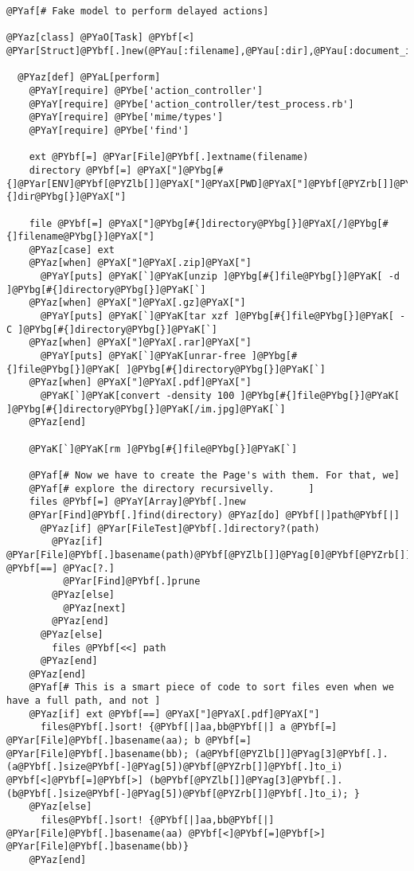 \begin{Verbatim}[commandchars=@\[\]]
@PYaf[# Fake model to perform delayed actions]

@PYaz[class] @PYaO[Task] @PYbf[<] @PYar[Struct]@PYbf[.]new(@PYau[:filename],@PYau[:dir],@PYau[:document_id])
  
  @PYaz[def] @PYaL[perform]
    @PYaY[require] @PYbe['action_controller']
    @PYaY[require] @PYbe['action_controller/test_process.rb']
    @PYaY[require] @PYbe['mime/types']
    @PYaY[require] @PYbe['find']
    
    ext @PYbf[=] @PYar[File]@PYbf[.]extname(filename)
    directory @PYbf[=] @PYaX["]@PYbg[#{]@PYar[ENV]@PYbf[@PYZlb[]]@PYaX["]@PYaX[PWD]@PYaX["]@PYbf[@PYZrb[]]@PYbg[}]@PYaX[/]@PYbg[#{]dir@PYbg[}]@PYaX["]

    file @PYbf[=] @PYaX["]@PYbg[#{]directory@PYbg[}]@PYaX[/]@PYbg[#{]filename@PYbg[}]@PYaX["]
    @PYaz[case] ext
    @PYaz[when] @PYaX["]@PYaX[.zip]@PYaX["]
      @PYaY[puts] @PYaK[`]@PYaK[unzip ]@PYbg[#{]file@PYbg[}]@PYaK[ -d ]@PYbg[#{]directory@PYbg[}]@PYaK[`]
    @PYaz[when] @PYaX["]@PYaX[.gz]@PYaX["]
      @PYaY[puts] @PYaK[`]@PYaK[tar xzf ]@PYbg[#{]file@PYbg[}]@PYaK[ -C ]@PYbg[#{]directory@PYbg[}]@PYaK[`]
    @PYaz[when] @PYaX["]@PYaX[.rar]@PYaX["]
      @PYaY[puts] @PYaK[`]@PYaK[unrar-free ]@PYbg[#{]file@PYbg[}]@PYaK[ ]@PYbg[#{]directory@PYbg[}]@PYaK[`]
    @PYaz[when] @PYaX["]@PYaX[.pdf]@PYaX["]
      @PYaK[`]@PYaK[convert -density 100 ]@PYbg[#{]file@PYbg[}]@PYaK[ ]@PYbg[#{]directory@PYbg[}]@PYaK[/im.jpg]@PYaK[`]
    @PYaz[end]
       
    @PYaK[`]@PYaK[rm ]@PYbg[#{]file@PYbg[}]@PYaK[`]
       
    @PYaf[# Now we have to create the Page's with them. For that, we]
    @PYaf[# explore the directory recursivelly.      ]
    files @PYbf[=] @PYaY[Array]@PYbf[.]new
    @PYar[Find]@PYbf[.]find(directory) @PYaz[do] @PYbf[|]path@PYbf[|]
      @PYaz[if] @PYar[FileTest]@PYbf[.]directory?(path)
        @PYaz[if] @PYar[File]@PYbf[.]basename(path)@PYbf[@PYZlb[]]@PYag[0]@PYbf[@PYZrb[]] @PYbf[==] @PYac[?.]
          @PYar[Find]@PYbf[.]prune
        @PYaz[else]
          @PYaz[next]
        @PYaz[end]
      @PYaz[else]
        files @PYbf[<<] path
      @PYaz[end]
    @PYaz[end]
    @PYaf[# This is a smart piece of code to sort files even when we have a full path, and not ]
    @PYaz[if] ext @PYbf[==] @PYaX["]@PYaX[.pdf]@PYaX["]
      files@PYbf[.]sort! {@PYbf[|]aa,bb@PYbf[|] a @PYbf[=] @PYar[File]@PYbf[.]basename(aa); b @PYbf[=] @PYar[File]@PYbf[.]basename(bb); (a@PYbf[@PYZlb[]]@PYag[3]@PYbf[.].(a@PYbf[.]size@PYbf[-]@PYag[5])@PYbf[@PYZrb[]]@PYbf[.]to_i) @PYbf[<]@PYbf[=]@PYbf[>] (b@PYbf[@PYZlb[]]@PYag[3]@PYbf[.].(b@PYbf[.]size@PYbf[-]@PYag[5])@PYbf[@PYZrb[]]@PYbf[.]to_i); }
    @PYaz[else]
      files@PYbf[.]sort! {@PYbf[|]aa,bb@PYbf[|] @PYar[File]@PYbf[.]basename(aa) @PYbf[<]@PYbf[=]@PYbf[>] @PYar[File]@PYbf[.]basename(bb)}
    @PYaz[end]
    

\end{Verbatim}

